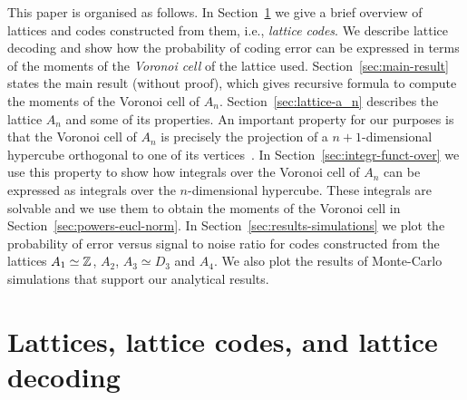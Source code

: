 \documentclass[draftcls, onecolumn, 11pt]{IEEEtran}
\begin{document}
This paper is organised as follows.  In Section~\ref{sec:latt-latt-codes} we give a brief overview of lattices and codes constructed from them, i.e., \emph{lattice codes}.  We describe lattice decoding and show how the probability of coding error can be expressed in terms of the moments of the \emph{Voronoi cell} of the lattice used.  Section~\ref{sec:main-result} states the main result (without proof), which gives recursive formula to compute the moments of the Voronoi cell of $A_n$.  Section~\ref{sec:lattice-a_n} describes the lattice $A_n$ and some of its properties.  An important property for our purposes is that the Voronoi cell of $A_n$ is precisely the projection of a $n+1$-dimensional hypercube orthogonal to one of its vertices~\cite{McKilliam2009CoxeterLattices,McKilliam2010thesis}.
In Section~\ref{sec:integr-funct-over} we use this property to show how integrals over the Voronoi cell of $A_n$ can be expressed as integrals over the $n$-dimensional hypercube. These integrals are solvable and we use them to obtain the moments of the Voronoi cell in Section~\ref{sec:powers-eucl-norm}.  In Section~\ref{sec:results-simulations} we plot the probability of error versus signal to noise ratio for codes constructed from the lattices $A_1 \simeq {\mathbb Z}$, $A_2$, $A_3 \simeq D_3$ and $A_4$.  We also plot the results of Monte-Carlo simulations that support our analytical results.




\section{Lattices, lattice codes, and lattice decoding} \label{sec:latt-latt-codes}
\end{document}
